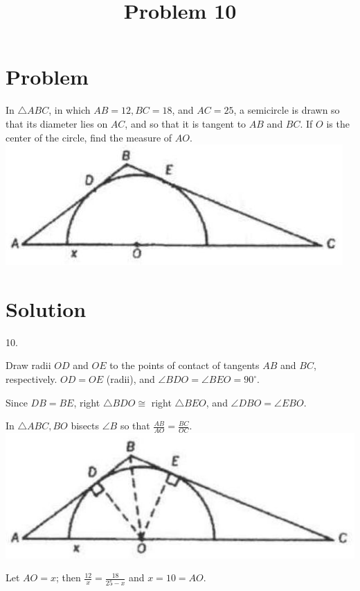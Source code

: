 \documentclass{article}
\title{Problem 10}
\date{}
\begin{document}
\maketitle

\section*{Problem}
In \(\triangle A B C\), in which \(A B=12, B C=18\), and \(A C=25\), a semicircle is drawn so that its diameter lies on \(A C\), and so that it is tangent to \(A B\) and \(B C\). If \(O\) is the center of the circle, find the measure of \(A O\).\\
\centering
\includegraphics[width=\textwidth]{images/problem_image_1.jpg}

\section*{Solution}
10.


Draw radii \(O D\) and \(O E\) to the points of contact of tangents \(A B\) and \(B C\), respectively. \(O D=O E\) (radii), and \(\angle B D O=\angle B E O=90^{\circ}\).

Since \(D B=B E\), right \(\triangle B D O \cong\) right \(\triangle B E O\), and \(\angle D B O=\angle E B O\).

In \(\triangle A B C, B O\) bisects \(\angle B\) so that \(\frac{A B}{A O}=\frac{B C}{O C}\).\\
\centering
\includegraphics[width=\textwidth]{images/reasoning_image_1.jpg}

Let \(A O=x\); then \(\frac{12}{x}=\frac{18}{25-x}\) and \(x=10=A O\).
\end{document}
